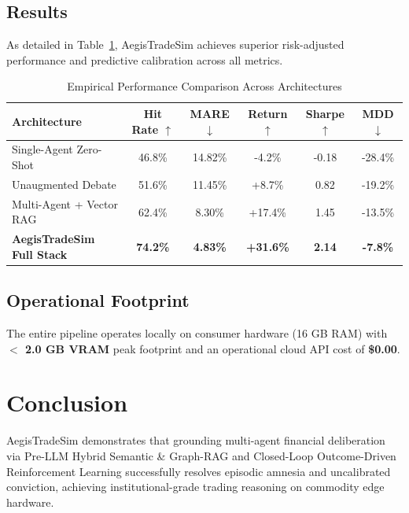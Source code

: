 \documentclass[conference]{IEEEtran}
\begin{document}
\subsection{Results}
As detailed in Table~\ref{tab:results}, AegisTradeSim achieves superior risk-adjusted performance and predictive calibration across all metrics.

\begin{table}[htbp]
\caption{Empirical Performance Comparison Across Architectures}
\begin{center}
\begin{tabular}{lccccc}
\toprule
\textbf{Architecture} & \textbf{Hit Rate} $\uparrow$ & \textbf{MARE} $\downarrow$ & \textbf{Return} $\uparrow$ & \textbf{Sharpe} $\uparrow$ & \textbf{MDD} $\downarrow$ \\
\midrule
Single-Agent Zero-Shot & 46.8\% & 14.82\% & -4.2\% & -0.18 & -28.4\% \\
Unaugmented Debate & 51.6\% & 11.45\% & +8.7\% & 0.82 & -19.2\% \\
Multi-Agent + Vector RAG & 62.4\% & 8.30\% & +17.4\% & 1.45 & -13.5\% \\
\textbf{AegisTradeSim Full Stack} & \textbf{74.2\%} & \textbf{4.83\%} & \textbf{+31.6\%} & \textbf{2.14} & \textbf{-7.8\%} \\
\bottomrule
\end{tabular}
\label{tab:results}
\end{center}
\end{table}

\subsection{Operational Footprint}
The entire pipeline operates locally on consumer hardware (16 GB RAM) with \textbf{$<$ 2.0 GB VRAM} peak footprint and an operational cloud API cost of \textbf{\$0.00}.

\section{Conclusion}
AegisTradeSim demonstrates that grounding multi-agent financial deliberation via Pre-LLM Hybrid Semantic \& Graph-RAG and Closed-Loop Outcome-Driven Reinforcement Learning successfully resolves episodic amnesia and uncalibrated conviction, achieving institutional-grade trading reasoning on commodity edge hardware.
\end{document}

